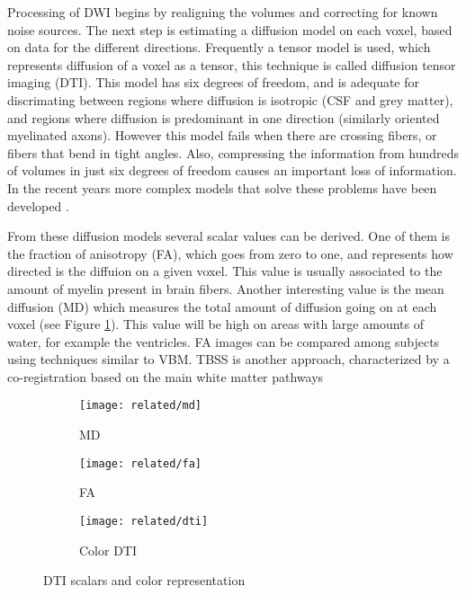 Processing of DWI begins by realigning the volumes and correcting for known noise sources. The next step is estimating a diffusion model on each voxel, based on data for the different directions. Frequently a tensor model is used, which represents diffusion of a voxel as a tensor, this technique is called diffusion tensor imaging (DTI). This model has six degrees of freedom, and is adequate for discrimating between regions where diffusion is isotropic (CSF and grey matter), and regions where diffusion is predominant in one direction (similarly oriented myelinated axons). However this model fails when there are crossing fibers, or fibers that bend in tight angles. Also, compressing the information from hundreds of volumes in just six degrees of freedom causes an important loss of information. In the recent years more complex models that solve these problems have been developed \autocite{tournier_diffusion_2011}.  

From these diffusion models several scalar values can be derived. One of them is the fraction of anisotropy (FA), which goes from zero to one, and represents how directed is the diffuion on a given voxel. This value is usually associated to the amount of myelin present in brain fibers. Another interesting value is the mean diffusion (MD) which measures the total amount of diffusion going on at each voxel (see Figure \ref{fig_dwi_scalars}). This value will be high on areas with large amounts of water, for example the ventricles. FA images can be compared among subjects using techniques similar to VBM. TBSS \autocite{smith_tract-based_2006} is another approach, characterized by a co-registration based on the main white matter pathways

\begin{figure}
    \centering
    \begin{subfigure}{0.3\textwidth}
        \texttt{[image: related/md]}
				\caption{MD}
    \end{subfigure} \hfill
		\begin{subfigure}{0.3\textwidth}
        \texttt{[image: related/fa]}
				\caption{FA}
    \end{subfigure} \hfill
		    \begin{subfigure}{0.3\textwidth}
        \texttt{[image: related/dti]}
				\caption{Color DTI}
    \end{subfigure}
    \caption{DTI scalars and color representation}\label{fig_dwi_scalars}
\end{figure}


